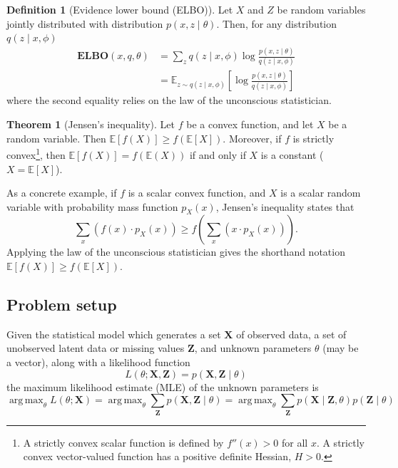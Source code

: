 \documentclass[11pt]{article}
\theoremstyle{definition}
\newtheorem*{theorem}{Theorem}
\newtheorem*{definition}{Definition}
\DeclareMathOperator*{\argmax}{arg\,max}
\begin{document}
\begin{definition}[Evidence lower bound (ELBO)]
Let $X$ and $Z$ be random variables jointly distributed with distribution $p(x, z \mid \theta)$. Then, for any distribution $q(z \mid x, \phi)$
$$
\begin{aligned}
\textbf{ELBO}(x, q, \theta)
&= \sum_z q(z \mid x, \phi) \log \frac{p(x, z \mid \theta)}{q(z \mid x, \phi)} \\
&= \mathbb{E}_{z \sim q(z \mid x, \phi)} \left[\log \frac{p(x, z \mid \theta)}{q(z \mid x, \phi)} \right]
\end{aligned}
$$
where the second equality relies on the law of the unconscious statistician.
\end{definition}

\begin{theorem}[Jensen's inequality]
Let $f$ be a convex function, and let $X$ be a random variable. Then $\mathbb{E}[f(X)] \geq f(\mathbb{E}[X])$. Moreover, if $f$ is strictly convex\footnote{A strictly convex scalar function is defined by $f''(x) > 0$ for all $x$. A strictly convex vector-valued function has a positive definite Hessian, $H > 0$.}, then $\mathbb{E}[f(X)] = f(\mathbb{E}(X))$ if and only if $X$ is a constant ($X = \mathbb{E}[X]$).
\end{theorem}

As a concrete example, if $f$ is a scalar convex function, and $X$ is a scalar random variable with probability mass function $p_X(x)$, Jensen's inequality states that
$$
\sum_x \left(f(x) \cdot p_X(x)\right) \geq f\left(\sum_x \left( x \cdot p_X(x) \right) \right).
$$
Applying the law of the unconscious statistician gives the shorthand notation $\mathbb{E}[f(X)] \geq f(\mathbb{E}[X])$.

\subsection{Problem setup}

Given the statistical model which generates a set $\mathbf{X}$ of observed data, a set of unobserved latent data or missing values $\mathbf{Z}$, and unknown parameters $\theta$ (may be a vector), along with a likelihood function
$$
L(\theta; \mathbf{X}, \mathbf{Z}) = p(\mathbf{X}, \mathbf{Z} \mid \theta)
$$
the maximum likelihood estimate (MLE) of the unknown parameters is
$$
\argmax_\theta L(\theta; \mathbf{X})
= \argmax_\theta \sum_\mathbf{Z} p(\mathbf{X}, \mathbf{Z} \mid \theta)
= \argmax_\theta \sum_\mathbf{Z} p(\mathbf{X} \mid \mathbf{Z}, \theta) p(\mathbf{Z} \mid \theta)
$$
\end{document}
